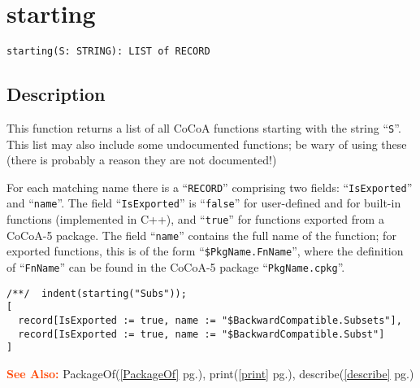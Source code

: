 \documentclass[a4paper]{mybook}
\newenvironment{command}{}{} %
\newcommand\SeeAlso{\par\textcolor{OrangeRed}{\textbf{\large See Also: }}}
\begin{document}
\section{starting}
\label{starting}
\begin{command} %


\begin{Verbatim}[label=syntax, rulecolor=\color{MidnightBlue},
frame=single]
starting(S: STRING): LIST of RECORD
\end{Verbatim}


\subsection*{Description}

This function returns a list of all CoCoA functions starting with the
string ``\verb&S&''.  This list may also include some undocumented
functions; be wary of using these (there is probably a reason they
are not documented!)
\par 
For each matching name there is a ``\verb&RECORD&'' comprising two fields:
``\verb&IsExported&'' and ``\verb&name&''.  The field ``\verb&IsExported&'' is ``\verb&false&'' for
user-defined and for built-in functions (implemented in C++), and ``\verb&true&''
for functions exported from a CoCoA-5 package.  The field ``\verb&name&'' contains
the full name of the function;  for exported functions, this is of the
form ``\verb&$PkgName.FnName&'', where the definition of ``\verb&FnName&'' can be found
in the CoCoA-5 package ``\verb&PkgName.cpkg&''.
\begin{Verbatim}[label=example, rulecolor=\color{PineGreen}, frame=single]
/**/  indent(starting("Subs"));
[
  record[IsExported := true, name := "$BackwardCompatible.Subsets"],
  record[IsExported := true, name := "$BackwardCompatible.Subst"]
]
\end{Verbatim}


\SeeAlso %
  PackageOf(\ref{PackageOf} pg.\pageref{PackageOf}), 
    print(\ref{print} pg.\pageref{print}), 
    describe(\ref{describe} pg.\pageref{describe})
\end{command} %
\end{document}
